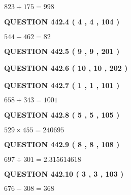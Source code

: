 \documentclass{ctexart}
\begin{document}
  
 
 

$ %
823 +  %
175=   %
998$
 
 
  
\vspace{0.2in}
  
{\textbf{\Large{QUESTION
442.4 
 ( 4 , 4 , 104 )
}}}
  
  
 
 

$ %
544 -  %
462=   %
82$
 
 
  
\vspace{0.2in}
  
{\textbf{\Large{QUESTION
442.5 
 ( 9 , 9 , 201 )
}}}
  
  
  
\vspace{0.2in}
  
{\textbf{\Large{QUESTION
442.6 
 ( 10 , 10 , 202 )
}}}
  
  
  
\vspace{0.2in}
  
{\textbf{\Large{QUESTION
442.7 
 ( 1 , 1 , 101 )
}}}
  
  
 
 

$ %
658 +  %
343=   %
1001$
 
 
  
\vspace{0.2in}
  
{\textbf{\Large{QUESTION
442.8 
 ( 5 , 5 , 105 )
}}}
  
  
 
 

$ %
529 \times  %
455=   %
240695$
 
 
  
\vspace{0.2in}
  
{\textbf{\Large{QUESTION
442.9 
 ( 8 , 8 , 108 )
}}}
  
  
 
 

$ %
697 \div  %
301=   %
2.315614618$
 
 
  
\vspace{0.2in}
  
{\textbf{\Large{QUESTION
442.10 
 ( 3 , 3 , 103 )
}}}
  
  
 
 

$ %
676 -  %
308=   %
368$
 
\end{document}
